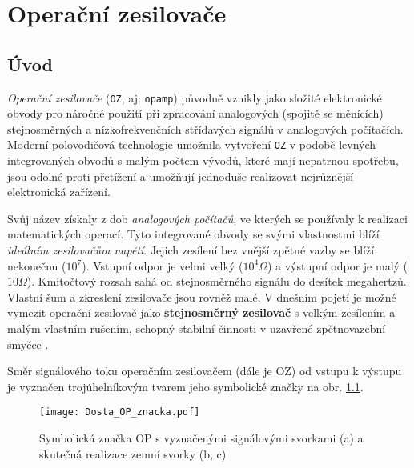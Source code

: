 {
\chapter{Operační zesilovače}
\minitoc
  \section{Úvod}
    \emph{Operační zesilovače} (\texttt{OZ}, aj: \texttt{opamp}) původně vznikly jako složité 
    elektronické obvody pro náročné použití při zpracování analogových (spojitě se měnících) 
    stejnosměrných a nízkofrekvenčních střídavých signálů v analogových počítačích. Moderní 
    polovodičová technologie umožnila vytvoření \texttt{OZ} v podobě levných integrovaných obvodů s 
    malým počtem vývodů, které mají nepatrnou spotřebu, jsou odolné proti přetížení a umožňují 
    jednoduše realizovat nejrůznější elektronická zařízení.
  
    Svůj název získaly z dob \emph{analogových počítačů}, ve kterých se používaly k realizaci 
    matematických operací. Tyto integrované obvody se svými vlastnostmi blíží \emph{ideálním 
    zesilovačům napětí}. Jejich zesílení bez vnější zpětné vazby se blíží nekonečnu ($10^7$). 
    Vstupní odpor je velmi velký ($10^4 \Omega$) a výstupní odpor je malý ($10 \Omega$). Kmitočtový 
    rozsah sahá od stejnosměrného signálu do desítek megahertzů. Vlastní šum a zkreslení zesilovače 
    jsou rovněž malé. V dnešním pojetí je možné vymezit operační zesilovač jako 
    \textbf{stejnosměrný zesilovač} s velkým zesílením a malým vlastním rušením, schopný stabilní 
    činnosti v uzavřené zpětnovazební smyčce \cite[s.~5]{Dostal}.

    Směr signálového toku operačním zesilovačem (dále je OZ) od vstupu k výstupu je vyznačen 
    trojúhelníkovým tvarem jeho symbolické značky na obr. \ref{AES:OP_znacka}.
    \begin{figure}[ht!]
      \centering
      \texttt{[image: Dosta\_OP\_znacka.pdf]}
      \caption[Symbolická značka OP]{Symbolická značka OP s vyznačenými signálovými svorkami (a) 
               a skutečná realizace zemní svorky (b, c)}
      \label{AES:OP_znacka}
    \end{figure}
  
}

